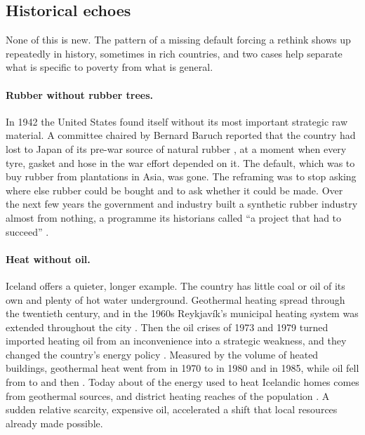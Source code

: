 \subsection{Historical echoes}
\label{sec:history}

None of this is new. The pattern of a missing default forcing a rethink shows
up repeatedly in history, sometimes in rich countries, and two cases help
separate what is specific to poverty from what is general.

\paragraph{Rubber without rubber trees.} In 1942 the United States found
itself without its most important strategic raw material. A committee chaired
by Bernard Baruch reported that the country had lost to Japan
\rubberLostShare{} of its pre-war source of natural rubber
\parencite{baruch1942rubber}, at a moment when every tyre, gasket and hose in
the war effort depended on it. The default, which was to buy rubber from
plantations in Asia, was gone. The reframing was to stop asking where else
rubber could be bought and to ask whether it could be made. Over the next few
years the government and industry built a synthetic rubber industry almost
from nothing, a programme its historians called ``a project that had to
succeed'' \parencite{herbert1985}.

\paragraph{Heat without oil.} Iceland offers a quieter, longer example. The
country has little coal or oil of its own and plenty of hot water underground.
Geothermal heating spread through the twentieth century, and in the 1960s
Reykjavík's municipal heating system was extended throughout the city
\parencite{ragnars1980}. Then the oil crises of 1973 and 1979 turned imported
heating oil from an inconvenience into a strategic weakness, and they changed
the country's energy policy \parencite{orkustofnun_heating}. Measured by the
volume of heated buildings, geothermal heat went from \icelandGeoStart{} in
1970 to \icelandGeoMid{} in 1980 and \icelandGeoEnd{} in 1985, while oil fell
from \icelandOilStart{} to \icelandOilMid{} and then \icelandOilEnd{}
\parencite{orkustofnun2020heating}. Today about \icelandGeoHeating{} of the
energy used to heat Icelandic homes comes from geothermal sources, and
district heating reaches \icelandDistrictHeating{} of the population
\parencite{orkustofnun_heating}. A sudden relative scarcity, expensive oil,
accelerated a shift that local resources already made possible.

